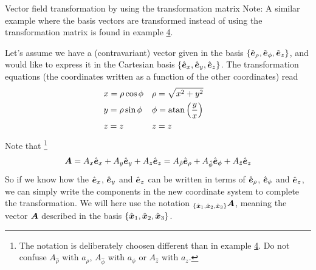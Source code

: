 \documentclass[a4paper, 12pt]{article}
\begin{document}
\begin{example}{Vector field transformation by using the transformation matrix}
 \label{ex:vft}
 Note: A similar example where the basis vectors are transformed instead of 
 using the transformation matrix is found in example \hyperref[ex:tbs]{4}.
 
 Let's assume we have a (contravariant) vector given in the basis
 $\{\hat{\boldsymbol{e}}_\rho,
 \hat{\boldsymbol{e}}_\phi, \hat{\boldsymbol{e}}_z\}$, and would like to express it in the Cartesian basis
 $\{\hat{\boldsymbol{e}}_x, \hat{\boldsymbol{e}}_y, \hat{\boldsymbol{e}}_z\}$. The transformation equations (the
 coordinates
 written as a function of the other coordinates) read
 \begin{align*}
  &x = \rho \cos\phi&
  &\rho = \sqrt{x^2+y^2}&
  \\
  &y = \rho \sin\phi&
  &\phi = \text{atan}\left(\frac{y}{x}\right)&
  \\
  &z=z&
  &z=z&
 \end{align*}
 Note that%
 \footnote{The notation is deliberately choosen different than in example 
           \hyperref[ex:tbs]{4}. Do not confuse $A_{\hat{\rho}}$ with 
	   $a_\rho$, $A_{\hat{\phi}}$ with $a_\phi$ or $A_{\hat{z}}$ with 
           $a_z$.}
 \begin{align}
  \boldsymbol{A} =
  A_x \hat{\boldsymbol{e}}_x + A_y \hat{\boldsymbol{e}}_y + A_z \hat{\boldsymbol{e}}_z =
  A_{\hat{\rho}} \hat{\boldsymbol{e}}_\rho + A_{\hat{\phi}} \hat{\boldsymbol{e}}_\phi + A_{\hat{z}} \hat{\boldsymbol{e}}_z
  \label{eq:component}
 \end{align}
 So if we know how the $\hat{\boldsymbol{e}}_x$, $\hat{\boldsymbol{e}}_y$ and $\hat{\boldsymbol{e}}_z$ can be written in
terms
 of $\hat{\boldsymbol{e}}_\rho$, $\hat{\boldsymbol{e}}_\phi$ and $\hat{\boldsymbol{e}}_z$, we can simply write the
components
 in the new coordinate system to complete the transformation. We will here use
 the notation $_{\{\hat{\boldsymbol{x}}_1, \hat{\boldsymbol{x}}_2, \hat{\boldsymbol{x}}_3\}} \boldsymbol{A}$, meaning the vector
 $\boldsymbol{A}$ described in the basis ${\{\hat{\boldsymbol{x}}_1, \hat{\boldsymbol{x}}_2, \hat{\boldsymbol{x}}_3\}}$.


\end{example}
\end{document}
